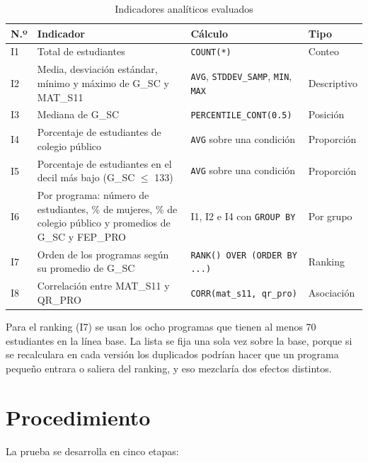\documentclass[11pt,openany,oneside,letterpaper]{book}
\begin{document}
\begin{table}[H]
\centering
\caption{Indicadores analíticos evaluados}
\label{tab:indicadores}
\small
\begin{tabularx}{\textwidth}{l >{\raggedright\arraybackslash}X >{\raggedright\arraybackslash}X l}
\toprule
\textbf{N.º} & \textbf{Indicador} & \textbf{Cálculo} & \textbf{Tipo} \\
\midrule
I1 & Total de estudiantes & \texttt{COUNT(*)} & Conteo \\
I2 & Media, desviación estándar, mínimo y máximo de G\_SC y MAT\_S11 & \texttt{AVG}, \texttt{STDDEV\_SAMP}, \texttt{MIN}, \texttt{MAX} & Descriptivo \\
I3 & Mediana de G\_SC & \texttt{PERCENTILE\_CONT(0.5)} & Posición \\
I4 & Porcentaje de estudiantes de colegio público & \texttt{AVG} sobre una condición & Proporción \\
I5 & Porcentaje de estudiantes en el decil más bajo (G\_SC $\leq$ 133) & \texttt{AVG} sobre una condición & Proporción \\
I6 & Por programa: número de estudiantes, \% de mujeres, \% de colegio público y promedios de G\_SC y FEP\_PRO & I1, I2 e I4 con \texttt{GROUP BY} & Por grupo \\
I7 & Orden de los programas según su promedio de G\_SC & \texttt{RANK() OVER (ORDER BY ...)} & Ranking \\
I8 & Correlación entre MAT\_S11 y QR\_PRO & \texttt{CORR(mat\_s11, qr\_pro)} & Asociación \\
\bottomrule
\end{tabularx}
\end{table}

Para el ranking (I7) se usan los ocho programas que tienen al menos 70 estudiantes en la línea base. La lista se fija una sola vez sobre la base, porque si se recalculara en cada versión los duplicados podrían hacer que un programa pequeño entrara o saliera del ranking, y eso mezclaría dos efectos distintos.

\section{Procedimiento}

La prueba se desarrolla en cinco etapas:
\end{document}
